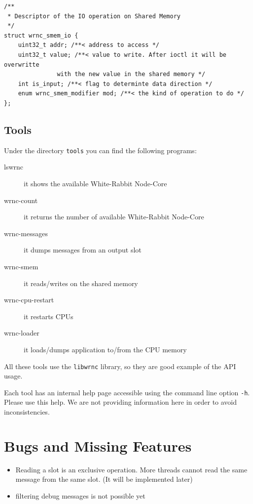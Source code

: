 \documentclass[a4paper,10pt]{article}
\begin{document}
\begin{lstlisting}
/**
 * Descriptor of the IO operation on Shared Memory
 */
struct wrnc_smem_io {
	uint32_t addr; /**< address to access */
	uint32_t value; /**< value to write. After ioctl it will be overwritte
			   with the new value in the shared memory */
	int is_input; /**< flag to determinte data direction */
	enum wrnc_smem_modifier mod; /**< the kind of operation to do */
};
\end{lstlisting}


\subsection{Tools}%
Under the directory \texttt{tools} you can find the following
programs:

\begin{description}
  \item[lswrnc] it shows the available White-Rabbit Node-Core
  \item[wrnc-count] it returns the number of available White-Rabbit
    Node-Core
  \item[wrnc-messages] it dumps messages from an output slot
  \item[wrnc-smem] it reads/writes on the shared memory
  \item[wrnc-cpu-restart] it restarts CPUs
  \item[wrnc-loader] it loads/dumps application to/from the CPU memory
\end{description}

All these tools use the \texttt{libwrnc} library, so they are good
example of the API usage.

Each tool has an internal help page accessible using the
command line option \texttt{-h}. Please use this help. We are not
providing information here in order to avoid inconsistencies.

\section{Bugs and Missing Features}%
\begin{itemize}
  \item Reading a slot is an exclusive operation. More threads cannot
    read the same message from the same slot. (It will be implemented
    later)
  \item filtering debug messages is not possible yet
\end{itemize}
\end{document}
